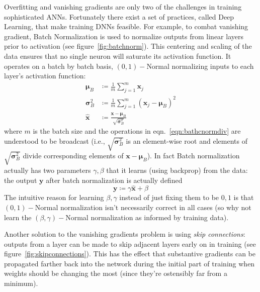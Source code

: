 

Overfitting and vanishing gradients are only two of the challenges in training sophisticated ANNs.
%
Fortunately there exist a set of practices, called Deep Learning, that make training DNNs feasible.
%
For example, to combat vanishing gradient, Batch Normalization \cite{ioffe2015batch} is used to normalize outputs from linear layers prior to activation (see figure~\ref{fig:batchnorm}).
%
This centering and scaling of the data ensures that no single neuron will saturate its activation function.
%
It operates on a batch by batch basis, \((0,1)-\)Normal normalizing inputs to each layer's activation function:
\begin{align}
    \bm{\mu} _{B}        & \coloneqq {\frac {1}{m}}\sum _{j=1}^{m}\bm{x}_{j}                                             \\
    \bm{\sigma} _{B}^{2} & \coloneqq{\frac {1}{m}}\sum _{j=1}^{m}(\bm{x}_{j}-\bm{\mu}_{B})^{2}                           \\
    {\hat {\bm{x}}}      & \coloneqq {\frac {\bm{x}-\bm{\mu}_{B}}{\sqrt {\bm{\sigma}_{B}^{2}}}} \label{eqn:bathcnormdiv}
\end{align}
where \(m\) is the batch size and the operations in eqn.~\eqref{eqn:bathcnormdiv} are understood to be broadcast (i.e., \(\sqrt {\bm{\sigma} _{B}^{2}}\) is an element-wise root and elements of \(\sqrt {\bm{\sigma} _{B}^{2}}\) divide corresponding elements of \(\bm{x}-\bm{\mu}_{B}\)).
%
In fact Batch normalization actually has two parameters \(\gamma, \beta\) that it learns (using backprop) from the data: the output \(\bm{y}\) after batch normalization is actually defined
\begin{equation}
    \bm{y} \coloneqq \gamma \bm{\hat{x}} + \beta 
\end{equation}
The intuitive reason for learning \(\beta, \gamma\) instead of just fixing them to be \(0,1\) is that \((0,1)-\)Normal normalization isn't necessarily correct in all cases (so why not learn the \((\beta,\gamma)-\)Normal normalization as informed by training data).
%


Another solution to the vanishing gradients problem is using \textit{skip connections}: outputs from a layer can be made to skip adjacent layers early on in training (see figure~\ref{fig:skipconnections}).
%
This has the effect that substantive gradients can be propagated farther back into the network during the initial part of training when weights should be changing the most (since they're ostensibly far from a minimum).

